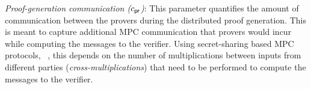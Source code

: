 \noindent\textit{Proof-generation communication ($c_\mathsf{pr}$)}:
This parameter quantifies the amount of communication between the provers during the distributed proof generation. 
This is meant to capture additional MPC communication that provers would incur while computing the messages to the verifier. 
Using secret-sharing based MPC protocols, ~\cite{GMW87, BGW88, SPDZ}, this depends on the number of multiplications between inputs 
from different parties ({\em cross-multiplications}) that need to be performed to compute the messages to the verifier. 



